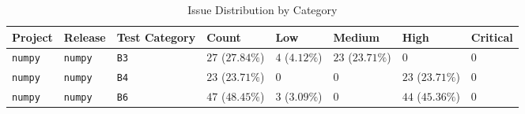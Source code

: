 \begin{table}
\caption{Issue Distribution by Category}
\label{tab:issue-category-distribution}
\begin{tabular}{llllllll}
\toprule
Project & Release & Test Category & Count & Low & Medium & High & Critical \\
\midrule
\texttt{numpy} & \texttt{numpy} & \texttt{B3} & $27$ ($27.84\%$) & $4$ ($4.12\%$) & $23$ ($23.71\%$) & $0$ & $0$ \\
\texttt{numpy} & \texttt{numpy} & \texttt{B4} & $23$ ($23.71\%$) & $0$ & $0$ & $23$ ($23.71\%$) & $0$ \\
\texttt{numpy} & \texttt{numpy} & \texttt{B6} & $47$ ($48.45\%$) & $3$ ($3.09\%$) & $0$ & $44$ ($45.36\%$) & $0$ \\
\bottomrule
\end{tabular}
\end{table}
